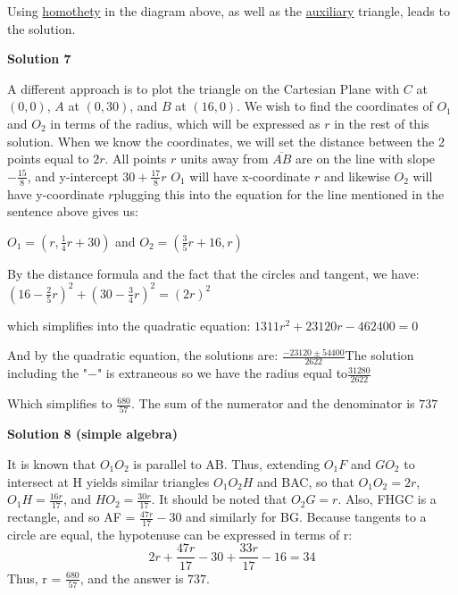 \begin{enumerate}
 Using \href{https://artofproblemsolving.com/wiki/index.php?title=Homothety}{homothety} in the diagram above, as well as the \href{https://artofproblemsolving.com/wiki/index.php?title=Auxiliary&action=edit&redlink=1}{auxiliary} triangle, leads to the solution.

 



\textbf{Solution 7}

A different approach is to plot the triangle on the Cartesian Plane with $C$ at $(0,0)$, $A$ at $(0,30)$, and $B$ at $(16,0)$. We wish to find the coordinates of $O_1$ and $O_2$ in terms of the radius, which will be expressed as $r$ in the rest of this solution. When we know the coordinates, we will set the distance between the 2 points equal to $2r$. All points $r$ units away from $\overline{AB}$ are on the line with slope $-\frac{15}{8}$, and y-intercept $30+ \frac{17}{8} r$
$O_1$ will have x-coordinate $r$ and likewise $O_2$ will have y-coordinate $r$plugging this into the equation for the line mentioned in the sentence above gives us:

 $O_1 = \left(r,\frac14 r+30\right)$ and $O_2 = \left(\frac35 r+16,r\right)$

 By the distance formula and the fact that the circles and tangent, we have: $\left(16-\frac25 r\right)^2 + \left(30-\frac34 r\right)^2 = (2r)^2$

 which simplifies into the quadratic equation: $1311 r^2 + 23120 r - 462400 = 0$

 And by the quadratic equation, the solutions are: $\frac{-23120 \pm 54400}{2622}$The solution including the "$-$" is extraneous so we have the radius equal to$\frac{31280}{2622}$

 Which simplifies to $\frac{680}{57}$. The sum of the numerator and the denominator is $\boxed{737}$




\textbf{Solution 8 (simple algebra)}

It is known that $O_1O_2$ is parallel to AB. Thus, extending $O_1F$ and $GO_2$ to intersect at H yields similar triangles $O_1O_2H$ and BAC, so that $O_1O_2 = 2r$, $O_1H = \frac{16r}{17}$, and $HO_2 = \frac{30r}{17}$. It should be noted that $O_2G = r$. Also, FHGC is a rectangle, and so AF = $\frac{47r}{17} - 30$ and similarly for BG. Because tangents to a circle are equal, the hypotenuse can be expressed in terms of r: 
 \[2r + \frac{47r}{17} - 30 + \frac{33r}{17} - 16 = 34\] Thus, r = $\frac{680}{57}$, and the answer is $\boxed{737}.$


\end{enumerate}

